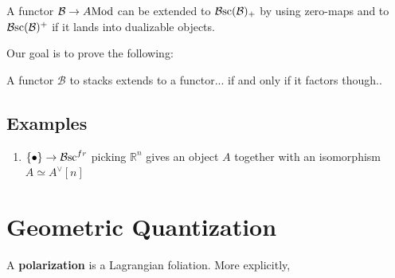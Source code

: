 \documentclass{article}
\begin{document}
A functor $\mathcal{B} \rightarrow A\textnormal{Mod}$ can be extended to $\operatorname{\mathcal{B}sc}(\mathcal{B})_+$ by using zero-maps and to $\operatorname{\mathcal{B}sc}(\mathcal{B})^+$ if it lands into dualizable objects.

Our goal is to prove the following: 
\begin{theorem}
    A functor $\mathcal{B}$ to stacks extends to a functor... if and only if it factors though.. 
\end{theorem}

\subsection{Examples}

\begin{enumerate}
    \item $\{\bullet\} \rightarrow \operatorname{\mathcal{B}sc}^{fr}$ picking $\mathbb{R}^n$ gives an object $A$ together with an isomorphism $A \simeq A^\vee[n]$
\end{enumerate}

\section{Geometric Quantization}

\begin{definition}
    A \textbf{polarization} is a Lagrangian foliation. More explicitly, 
\end{definition}
\end{document}
